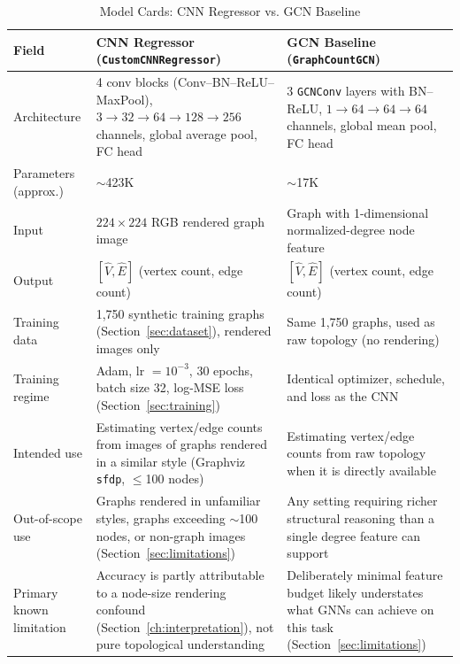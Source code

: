 \documentclass[11pt,letterpaper]{article}
\numberwithin{equation}{section}
\numberwithin{figure}{section}
\numberwithin{table}{section}
\begin{document}
\begin{table}[htbp]
\centering
\caption{Model Cards: CNN Regressor vs. GCN Baseline}
\label{tab:modelcard}
\small
\begin{tabular}{p{2.4cm}p{5.4cm}p{5.4cm}}
\toprule
Field & CNN Regressor (\texttt{CustomCNNRegressor}) & GCN Baseline (\texttt{GraphCountGCN}) \\
\midrule
Architecture & 4 conv blocks (Conv--BN--ReLU--MaxPool), $3\to32\to64\to128\to256$ channels, global average pool, FC head & 3 \texttt{GCNConv} layers with BN--ReLU, $1\to64\to64\to64$ channels, global mean pool, FC head \\
Parameters (approx.) & $\sim$423K & $\sim$17K \\
Input & $224\times224$ RGB rendered graph image & Graph with 1-dimensional normalized-degree node feature \\
Output & $[\hat{V}, \hat{E}]$ (vertex count, edge count) & $[\hat{V}, \hat{E}]$ (vertex count, edge count) \\
Training data & 1,750 synthetic training graphs (Section~\ref{sec:dataset}), rendered images only & Same 1,750 graphs, used as raw topology (no rendering) \\
Training regime & Adam, lr $=10^{-3}$, 30 epochs, batch size 32, log-MSE loss (Section~\ref{sec:training}) & Identical optimizer, schedule, and loss as the CNN \\
Intended use & Estimating vertex/edge counts from images of graphs rendered in a similar style (Graphviz \texttt{sfdp}, $\le$100 nodes) & Estimating vertex/edge counts from raw topology when it is directly available \\
Out-of-scope use & Graphs rendered in unfamiliar styles, graphs exceeding $\sim$100 nodes, or non-graph images (Section~\ref{sec:limitations}) & Any setting requiring richer structural reasoning than a single degree feature can support \\
Primary known limitation & Accuracy is partly attributable to a node-size rendering confound (Section~\ref{ch:interpretation}), not pure topological understanding & Deliberately minimal feature budget likely understates what GNNs can achieve on this task (Section~\ref{sec:limitations}) \\
\bottomrule
\end{tabular}
\end{table}

\end{document}
